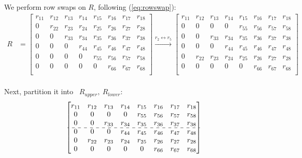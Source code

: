 \documentclass[12pt]{article}
\numberwithin{equation}{section}
\begin{document}
\fi
We perform row swaps on $R$, following (\ref{eq:rowswap}):
\begin{align*}
R &=
  \begin{bmatrix}
 r_{11} & r_{12} & r_{13} & r_{14} & r_{15} & r_{16} & r_{17} & r_{18}\\
 0      & r_{22} & r_{23} & r_{24} & r_{25} & r_{26} & r_{27} & r_{28}\\
 0      & 0      & r_{33} & r_{34} & r_{35} & r_{36} & r_{37} & r_{38}\\
 0      & 0      & 0      & r_{44} & r_{45} & r_{46} & r_{47} & r_{48}\\
 0      & 0      & 0      & 0      & r_{55} & r_{56} & r_{57} & r_{58}\\
 0      & 0      & 0      & 0      & 0      & r_{66} & r_{67} & r_{68}\\
\end{bmatrix}
\xrightarrow{r_{2} \leftrightarrow r_{5}}
\begin{bmatrix}
 r_{11} & r_{12} & r_{13} & r_{14} & r_{15} & r_{16} & r_{17} & r_{18}\\
 0      & 0      & 0      & 0      & r_{55} & r_{56} & r_{57} & r_{58}\\
 0      & 0      & r_{33} & r_{34} & r_{35} & r_{36} & r_{37} & r_{38}\\
 0      & 0      & 0      & r_{44} & r_{45} & r_{46} & r_{47} & r_{48}\\
 0      & r_{22} & r_{23} & r_{24} & r_{25} & r_{26} & r_{27} & r_{28}\\
 0      & 0      & 0      & 0      & 0      & r_{66} & r_{67} & r_{68}\\
\end{bmatrix}
\end{align*}\\
Next, partition it into \ $R_{upper}, \ R_{lower}$:
 \begin{align*}
 \begin{bmatrix}
 r_{11} & r_{12} & r_{13} & r_{14} & r_{15} & r_{16} & r_{17} & r_{18}\\
 0      & 0      & 0      & 0      & r_{55} & r_{56} & r_{57} & r_{58}\\
 0      & 0      & r_{33} & r_{34} & r_{35} & r_{36} & r_{37} & r_{38}\\
 \cdashline{1-8}
 0      & 0      & 0      & r_{44} & r_{45} & r_{46} & r_{47} & r_{48}\\
 0      & r_{22}  & r_{23} & r_{24} & r_{25} & r_{26} & r_{27} & r_{28}\\
 0      & 0      & 0      & 0      & 0      & r_{66} & r_{67} & r_{68}\\
\end{bmatrix}
\end{align*}
\end{document}
